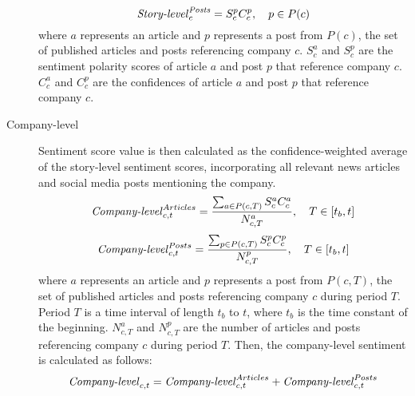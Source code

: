 \begin{description}
    \begin{equation}
    \label{eq:story-level-post-sentiment}
    \text{\textit{Story-level}}_{c}^{\text{\textit{Posts}}} = S_{c}^{p} C_{c}^{p}, \quad p \in P(c)
    \end{equation} where $a$ represents an article and $p$ represents a post from $P(c)$, the set of published articles and posts referencing company $c$. $S_{c}^{a}$ and $S_{c}^{p}$ are the sentiment polarity scores of article $a$ and post $p$ that reference company $c$. $C_{c}^{a}$ and $C_{c}^{p}$ are the confidences of article $a$ and post $p$ that reference company $c$.
    \item[Company-level] Sentiment score value is then calculated as the confidence-weighted average of the story-level sentiment scores, incorporating all relevant news articles and social media posts mentioning the company.
    \begin{equation}
        \label{eq:company-level-article-sentiment}
        \text{\textit{Company-level}}_{c,t}^{Articles} = \frac{\sum_{a \in P(c,T)} S_{c}^{a} C_{c}^{a}}{N_{c,T}^{a}}, \quad T \in [t_{b}, t]
    \end{equation}
    \begin{equation}
        \label{eq:company-level-post-sentiment}
        \text{\textit{Company-level}}_{c,t}^{Posts} = \frac{\sum_{p \in P(c,T)} S_{c}^{p} C_{c}^{p}}{N_{c,T}^{p}}, \quad T \in [t_{b}, t]
    \end{equation} where $a$ represents an article and $p$ represents a post from $P(c,T)$, the set of published articles and posts referencing company $c$ during period $T$. Period $T$ is a time interval of length $t_{b}$ to $t$, where $t_{b}$ is the time constant of the beginning. $N_{c,T}^{a}$ and $N_{c,T}^{p}$ are the number of articles and posts referencing company $c$ during period $T$. Then, the company-level sentiment is calculated as follows:
    \begin{equation}
    \label{eq:company-level-sentiment}
    \text{\textit{Company-level}}_{c,t} = \text{\textit{Company-level}}_{c,t}^{Articles} + \text{\textit{Company-level}}_{c,t}^{Posts}
    \end{equation}
 \end{description}

